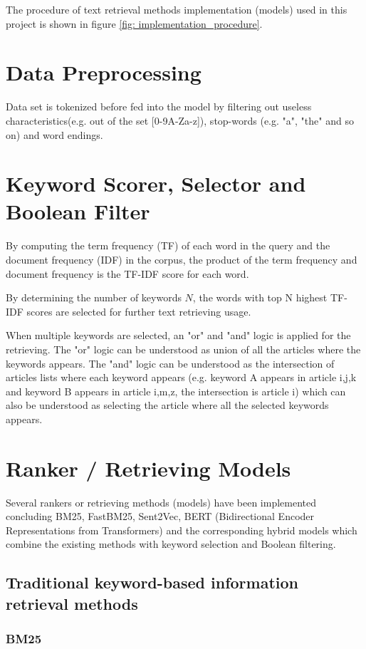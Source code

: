\documentclass[10pt,a4paper,fleqn]{report}
\begin{document}
	The procedure of text retrieval methods implementation (models) used in this project is shown in figure \ref{fig: implementation_procedure}.
	
	\section{Data Preprocessing}
	Data set is tokenized before fed into the model by filtering out useless characteristics(e.g. out of the set [0-9A-Za-z]), stop-words (e.g.  "a", "the" and so on) and word endings.
	
	\section{Keyword Scorer, Selector and Boolean Filter}
	By computing the term frequency (TF) of each word in the query and the document frequency (IDF) in the corpus, the product of the term frequency and document frequency is the TF-IDF score for each word. 
	
	By determining the number of keywords $N$, the words with top N highest TF-IDF scores are selected for further text retrieving usage.
	
	When multiple keywords are selected, an "or" and "and" logic is applied for the retrieving. 
	The "or" logic can be understood as union of all the articles where the keywords appears.
	The "and" logic can be understood as the intersection of articles lists where each keyword appears (e.g. keyword A appears in article i,j,k and keyword B appears in article i,m,z, the intersection is article i) which can also be understood as selecting the article where all the selected keywords appears.
	
	\section{Ranker / Retrieving Models}
	Several rankers or retrieving methods (models) have been implemented concluding BM25, FastBM25, Sent2Vec, BERT (Bidirectional Encoder Representations from Transformers) and the corresponding hybrid models which combine the existing methods with keyword selection and Boolean filtering.
		
		\subsection{Traditional keyword-based information retrieval methods}
		
			\subsubsection{BM25}
			
\end{document}

